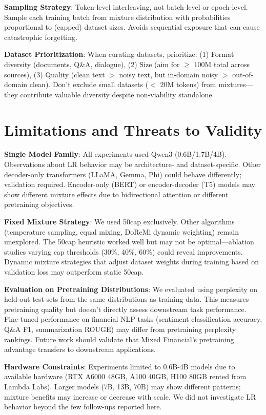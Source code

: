 \textbf{Sampling Strategy}: Token-level interleaving, not batch-level or epoch-level. Sample each training batch from mixture distribution with probabilities proportional to (capped) dataset sizes. Avoids sequential exposure that can cause catastrophic forgetting.

\textbf{Dataset Prioritization}: When curating datasets, prioritize: (1) Format diversity (documents, Q\&A, dialogue), (2) Size (aim for $\geq$ 100M total across sources), (3) Quality (clean text $>$ noisy text, but in-domain noisy $>$ out-of-domain clean). Don't exclude small datasets ($<$ 20M tokens) from mixtures—they contribute valuable diversity despite non-viability standalone.

\section{Limitations and Threats to Validity}

\textbf{Single Model Family}: All experiments used Qwen3 (0.6B/1.7B/4B). Observations about LR behavior may be architecture- and dataset-specific. Other decoder-only transformers (LLaMA, Gemma, Phi) could behave differently; validation required. Encoder-only (BERT) or encoder-decoder (T5) models may show different mixture effects due to bidirectional attention or different pretraining objectives.

\textbf{Fixed Mixture Strategy}: We used 50cap exclusively. Other algorithms (temperature sampling, equal mixing, DoReMi dynamic weighting) remain unexplored. The 50cap heuristic worked well but may not be optimal—ablation studies varying cap thresholds (30\%, 40\%, 60\%) could reveal improvements. Dynamic mixture strategies that adjust dataset weights during training based on validation loss may outperform static 50cap.

\textbf{Evaluation on Pretraining Distributions}: We evaluated using perplexity on held-out test sets from the same distributions as training data. This measures pretraining quality but doesn't directly assess downstream task performance. Fine-tuned performance on financial NLP tasks (sentiment classification accuracy, Q\&A F1, summarization ROUGE) may differ from pretraining perplexity rankings. Future work should validate that Mixed Financial's pretraining advantage transfers to downstream applications.

\textbf{Hardware Constraints}: Experiments limited to 0.6B-4B models due to available hardware (RTX A6000 48GB, A100 40GB, H100 80GB rented from Lambda Labs). Larger models (7B, 13B, 70B) may show different patterns; mixture benefits may increase or decrease with scale. We did not investigate LR behavior beyond the few follow-ups reported here.

